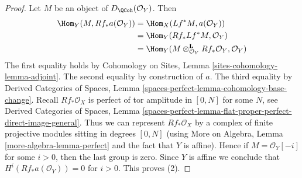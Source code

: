\begin{proof}
\medskip\noindent
Let $M$ be an object of $D_\QCoh(\mathcal{O}_Y)$. Then
\begin{align*}
\Hom_Y(M, Rf_*a(\mathcal{O}_Y)) & =
\Hom_X(Lf^*M, a(\mathcal{O}_Y)) \\
& =
\Hom_Y(Rf_*Lf^*M, \mathcal{O}_Y) \\
& =
\Hom_Y(M \otimes_{\mathcal{O}_Y}^\mathbf{L} Rf_*\mathcal{O}_Y, \mathcal{O}_Y)
\end{align*}
The first equality holds by Cohomology on Sites, Lemma
\ref{sites-cohomology-lemma-adjoint}.
The second equality by construction of $a$.
The third equality by Derived Categories of Spaces, Lemma
\ref{spaces-perfect-lemma-cohomology-base-change}.
Recall $Rf_*\mathcal{O}_X$ is perfect of tor amplitude in $[0, N]$
for some $N$, see
Derived Categories of Spaces, Lemma
\ref{spaces-perfect-lemma-flat-proper-perfect-direct-image-general}.
Thus we can represent $Rf_*\mathcal{O}_X$ by a complex of
finite projective modules sitting in degrees $[0, N]$
(using More on Algebra, Lemma \ref{more-algebra-lemma-perfect}
and the fact that $Y$ is affine).
Hence if $M = \mathcal{O}_Y[-i]$ for some $i > 0$, then the last
group is zero. Since $Y$ is affine we conclude that
$H^i(Rf_*a(\mathcal{O}_Y)) = 0$ for $i > 0$.
This proves (2).


\end{proof}
